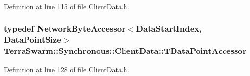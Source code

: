 Definition at line 115 of file Client\-Data.\-h.

\hypertarget{class_terra_swarm_1_1_synchronous_1_1_client_data_a69ba4da130856d78eec92c6dcdb61c58}{
\subsubsection[{T\-Data\-Point\-Accessor}]{\setlength{\rightskip}{0pt plus 5cm}typedef {\bf Network\-Byte\-Accessor}$<${\bf Data\-Start\-Index}, {\bf Data\-Point\-Size}$>$ {\bf Terra\-Swarm\-::\-Synchronous\-::\-Client\-Data\-::\-T\-Data\-Point\-Accessor}\hspace{0.3cm}{\ttfamily [private]}}}\label{class_terra_swarm_1_1_synchronous_1_1_client_data_a69ba4da130856d78eec92c6dcdb61c58}


Definition at line 128 of file Client\-Data.\-h.



